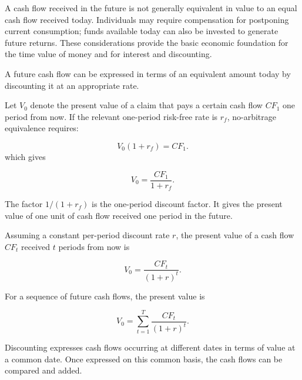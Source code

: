 A cash flow received in the future is not generally equivalent in value to an equal cash flow received today. Individuals may require compensation for postponing current consumption; funds available today can also be invested to generate future returns. These considerations provide the basic economic foundation for the time value of money and for interest and discounting.

A future cash flow can be expressed in terms of an equivalent amount today by discounting it at an appropriate rate.

Let \(V_0\) denote the present value of a claim that pays a certain cash flow \(CF_1\) one period from now. If the relevant one-period risk-free rate is \(r_{f}\), no-arbitrage equivalence requires:

\begin{equation*}
V_0(1+r_{f})=CF_1.
\label{eq:ch5-one-period-equivalence}
\end{equation*}
which gives

\begin{equation*}
V_0=\frac{CF_1}{1+r_{f}}.
\label{eq:ch5-one-period-pv}
\end{equation*}

The factor $1/(1+r_{f})$ is the one-period discount factor.
It gives the present value of one unit of cash flow
received one period in the future.

Assuming a constant per-period discount rate $r$,
the present value of a cash flow $CF_t$ received
$t$ periods from now is

\[
V_0=\frac{CF_t}{(1+r)^t}.
\]

For a sequence of future cash flows, the present
value is

\begin{equation}
V_0=\sum_{t=1}^{T}
\frac{CF_t}{(1+r)^t}.
\label{eq:ch5-pv-cash-flow-stream}
\end{equation}

Discounting expresses cash flows occurring at different dates in terms of value at a common date. Once expressed on this common basis, the cash flows can be compared and added.


